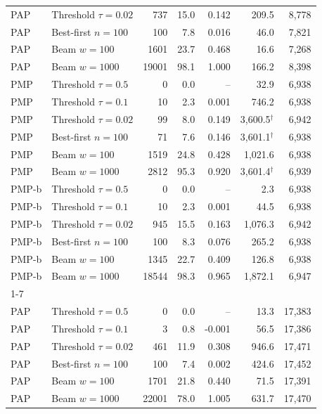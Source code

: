 \documentclass[11pt,a4paper]{article}
\begin{document}
\begin{table}[h]
\begin{tabular}{llrrrrr}
\quad PAP & Threshold $\tau{=}0.02$ & 737 & 15.0 & 0.142 & 209.5 & 8,778 \\
\quad PAP & Best-first $n{=}100$ & 100 & 7.8 & 0.016 & 46.0 & 7,821 \\
\quad PAP & Beam $w{=}100$ & 1601 & 23.7 & 0.468 & 16.6 & 7,268 \\
\quad PAP & Beam $w{=}1000$ & 19001 & 98.1 & 1.000 & 166.2 & 8,398 \\
\quad PMP & Threshold $\tau{=}0.5$ & 0 & 0.0 & -- & 32.9 & 6,938 \\
\quad PMP & Threshold $\tau{=}0.1$ & 10 & 2.3 & 0.001 & 746.2 & 6,938 \\
\quad PMP & Threshold $\tau{=}0.02$ & 99 & 8.0 & 0.149 & 3,600.5$^{\dagger}$ & 6,942 \\
\quad PMP & Best-first $n{=}100$ & 71 & 7.6 & 0.146 & 3,601.1$^{\dagger}$ & 6,938 \\
\quad PMP & Beam $w{=}100$ & 1519 & 24.8 & 0.428 & 1,021.6 & 6,938 \\
\quad PMP & Beam $w{=}1000$ & 2812 & 95.3 & 0.920 & 3,601.4$^{\dagger}$ & 6,939 \\
\quad PMP-b & Threshold $\tau{=}0.5$ & 0 & 0.0 & -- & 2.3 & 6,938 \\
\quad PMP-b & Threshold $\tau{=}0.1$ & 10 & 2.3 & 0.001 & 44.5 & 6,938 \\
\quad PMP-b & Threshold $\tau{=}0.02$ & 945 & 15.5 & 0.163 & 1,076.3 & 6,942 \\
\quad PMP-b & Best-first $n{=}100$ & 100 & 8.3 & 0.076 & 265.2 & 6,938 \\
\quad PMP-b & Beam $w{=}100$ & 1345 & 22.7 & 0.409 & 126.8 & 6,938 \\
\quad PMP-b & Beam $w{=}1000$ & 18544 & 98.3 & 0.965 & 1,872.1 & 6,947 \\
\cmidrule(l){1-7}
\multicolumn{7}{l}{\quad\itshape positional} \\
\quad PAP & Threshold $\tau{=}0.5$ & 0 & 0.0 & -- & 13.3 & 17,383 \\
\quad PAP & Threshold $\tau{=}0.1$ & 3 & 0.8 & -0.001 & 56.5 & 17,386 \\
\quad PAP & Threshold $\tau{=}0.02$ & 461 & 11.9 & 0.308 & 946.6 & 17,471 \\
\quad PAP & Best-first $n{=}100$ & 100 & 7.4 & 0.002 & 424.6 & 17,452 \\
\quad PAP & Beam $w{=}100$ & 1701 & 21.8 & 0.440 & 71.5 & 17,391 \\
\quad PAP & Beam $w{=}1000$ & 22001 & 78.0 & 1.005 & 631.7 & 17,470 \\

\end{tabular}
\end{table}
\end{document}
